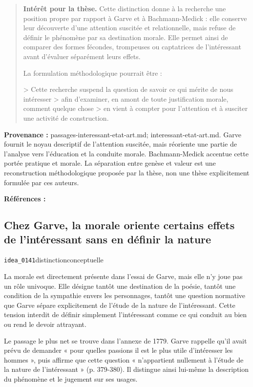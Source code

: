 \documentclass[10pt,a4paper]{article}
\begin{document}
\begin{quote}
\textbf{Intérêt pour la thèse.} Cette distinction donne à la recherche une position propre par rapport à Garve et à Bachmann-Medick : elle conserve leur découverte d'une attention suscitée et relationnelle, mais refuse de définir le phénomène par sa destination morale. Elle permet ainsi de comparer des formes fécondes, trompeuses ou captatrices de l'intéressant avant d'évaluer séparément leurs effets.

La formulation méthodologique pourrait être :

> Cette recherche suspend la question de savoir ce qui mérite de nous intéresser > afin d'examiner, en amont de toute justification morale, comment quelque chose > en vient à compter pour l'attention et à susciter une activité de construction.
\end{quote}
{\footnotesize\color{metadata}\textbf{Provenance :} passages-interessant-etat-art.md; interessant-etat-art.md. Garve fournit le noyau descriptif de l'attention suscitée, mais réoriente une partie de l'analyse vers l'éducation et la conduite morale. Bachmann-Medick accentue cette portée pratique et morale. La séparation entre genèse et valeur est une reconstruction méthodologique proposée par la thèse, non une thèse explicitement formulée par ces auteurs.\par}
{\footnotesize\color{metadata}\textbf{Références :} \parencite{garve1779interessirende,bachmannmedick2008anziehungskraft}\par}

\subsection{Chez Garve, la morale oriente certains effets de l'intéressant sans en définir la nature}
{\small\color{metadata} \texttt{idea\_0141}\quad\textbullet\quad distinction\quad\textbullet\quad conceptuelle\par}

La morale est directement présente dans l'essai de Garve, mais elle n'y joue pas un rôle univoque. Elle désigne tantôt une destination de la poésie, tantôt une condition de la sympathie envers les personnages, tantôt une question normative que Garve sépare explicitement de l'étude de la nature de l'intéressant. Cette tension interdit de définir simplement l'intéressant comme ce qui conduit au bien ou rend le devoir attrayant.

Le passage le plus net se trouve dans l'annexe de 1779. Garve rappelle qu'il avait prévu de demander « pour quelles passions il est le plus utile d'intéresser les hommes », puis affirme que cette question « n'appartient nullement à l'étude de la nature de l'intéressant » (p. 379-380). Il distingue ainsi lui-même la description du phénomène et le jugement sur ses usages.
\end{document}

